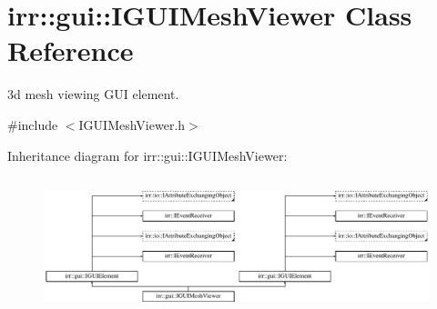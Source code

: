 \hypertarget{classirr_1_1gui_1_1IGUIMeshViewer}{}\section{irr\+:\+:gui\+:\+:I\+G\+U\+I\+Mesh\+Viewer Class Reference}
\label{classirr_1_1gui_1_1IGUIMeshViewer}


3d mesh viewing G\+UI element.  




{\ttfamily \#include $<$I\+G\+U\+I\+Mesh\+Viewer.\+h$>$}

Inheritance diagram for irr\+:\+:gui\+:\+:I\+G\+U\+I\+Mesh\+Viewer\+:\begin{figure}[H]
\begin{center}
\leavevmode
\includegraphics[height=4.038462cm]{classirr_1_1gui_1_1IGUIMeshViewer}
\end{center}
\end{figure}
